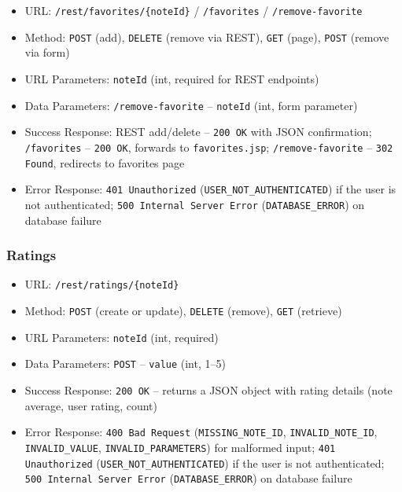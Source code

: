 \begin{itemize}
    \item URL: \texttt{/rest/favorites/\{noteId\}} / \texttt{/favorites} / \texttt{/remove-favorite}
    \item Method: \texttt{POST} (add), \texttt{DELETE} (remove via REST), \texttt{GET} (page), \texttt{POST} (remove via form)
    \item URL Parameters: \texttt{noteId} (int, required for REST endpoints)
    \item Data Parameters: \texttt{/remove-favorite} -- \texttt{noteId} (int, form parameter)
    \item Success Response: REST add/delete -- \texttt{200 OK} with JSON confirmation; \texttt{/favorites} -- \texttt{200 OK}, forwards to \texttt{favorites.jsp}; \texttt{/remove-favorite} -- \texttt{302 Found}, redirects to favorites page
    \item Error Response: \texttt{401 Unauthorized} (\texttt{USER\_NOT\_AUTHENTICATED}) if the user is not authenticated; \texttt{500 Internal Server Error} (\texttt{DATABASE\_ERROR}) on database failure
\end{itemize}

\subsubsection*{Ratings}

\begin{itemize}
    \item URL: \texttt{/rest/ratings/\{noteId\}}
    \item Method: \texttt{POST} (create or update), \texttt{DELETE} (remove), \texttt{GET} (retrieve)
    \item URL Parameters: \texttt{noteId} (int, required)
    \item Data Parameters: \texttt{POST} -- \texttt{value} (int, 1--5)
    \item Success Response: \texttt{200 OK} -- returns a JSON object with rating details (note average, user rating, count)
    \item Error Response: \texttt{400 Bad Request} (\texttt{MISSING\_NOTE\_ID}, \texttt{INVALID\_NOTE\_ID}, \texttt{INVALID\_VALUE}, \texttt{INVALID\_PARAMETERS}) for malformed input; \texttt{401 Unauthorized} (\texttt{USER\_NOT\_AUTHENTICATED}) if the user is not authenticated; \texttt{500 Internal Server Error} (\texttt{DATABASE\_ERROR}) on database failure
\end{itemize}

